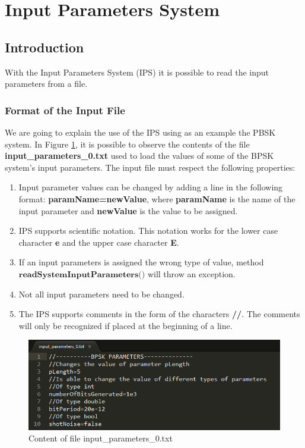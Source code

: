 \section{Input Parameters System}
\subsection{Introduction}
With the Input Parameters System (IPS) it is possible to read the input parameters from a file.

\subsubsection{Format of the Input File}
We are going to explain the use of the IPS using as an example the PBSK system.
In Figure \ref{fig:ipsfilecontent}, it is possible to observe the contents of the file \textbf{input\_parameters\_0.txt} used to load the values of some of the BPSK system's input parameters. The input file must respect the following properties:
\begin{enumerate}
\item Input parameter values can be changed by adding a line in the following format: \textbf{paramName=newValue}, where \textbf{paramName} is the name of the input parameter and \textbf{newValue} is the value to be assigned.
\item IPS supports scientific notation. This notation works for the lower case character \textbf{e} and the upper case character \textbf{E}.
\item If an input parameters is assigned the wrong type of value, method $\textbf{readSystemInputParameters()}$ will throw an exception.
\item Not all input parameters need to be changed.
\item The IPS supports comments in the form of the characters \textbf{//}. The comments will only be recognized if placed at the beginning of a line.
\end{enumerate}

\begin{figure}[H]
\centering
\includegraphics[width=0.8\linewidth]{./chapter/simulator_structure/figures/ips_input_file}
\caption{Content of file input\_parameters\_0.txt}
\label{fig:ipsfilecontent}
\end{figure}
\pagebreak
